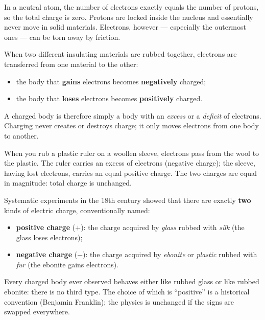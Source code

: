 \documentclass[11pt]{article}
\newcommand{\cle}[1]{{\popxbold\color{popdark}#1}}
\newcounter{popsec}
\newcounter{popsub}
\newcommand{\courssub}[1]{%
  \stepcounter{popsub}%
  \par\vspace{9pt}\noindent{\popxbold\fontsize{11.5}{13}\selectfont\color{popink}{\color{poporange}\thepopsec.\thepopsub}\hspace{6pt}#1}\par\nopagebreak\vspace{4pt}
}
\begin{document}
In a neutral atom, the number of electrons exactly equals the number of protons, so the total charge is zero. Protons are locked inside the nucleus and essentially never move in solid materials. Electrons, however — especially the outermost ones — can be torn away by friction.

\begin{propriete}
When two different insulating materials are rubbed together, \cle{electrons} are transferred from one material to the other:
\begin{itemize}
\item the body that \textbf{gains} electrons becomes \textbf{negatively} charged;
\item the body that \textbf{loses} electrons becomes \textbf{positively} charged.
\end{itemize}
A charged body is therefore simply a body with an \emph{excess} or a \emph{deficit} of electrons. Charging never creates or destroys charge; it only moves electrons from one body to another.
\end{propriete}

\begin{exemplebox}
When you rub a plastic ruler on a woollen sleeve, electrons pass from the wool to the plastic. The ruler carries an excess of electrons (negative charge); the sleeve, having lost electrons, carries an equal positive charge. The two charges are equal in magnitude: total charge is unchanged.
\end{exemplebox}

\courssub{The Two Types of Charge}

Systematic experiments in the 18th century showed that there are exactly \textbf{two} kinds of electric charge, conventionally named:

\begin{itemize}
\item \textbf{positive charge} ($+$): the charge acquired by \emph{glass} rubbed with \emph{silk} (the glass loses electrons);
\item \textbf{negative charge} ($-$): the charge acquired by \emph{ebonite} or \emph{plastic} rubbed with \emph{fur} (the ebonite gains electrons).
\end{itemize}

Every charged body ever observed behaves either like rubbed glass or like rubbed ebonite: there is no third type. The choice of which is ``positive'' is a historical convention (Benjamin Franklin); the physics is unchanged if the signs are swapped everywhere.
\end{document}
